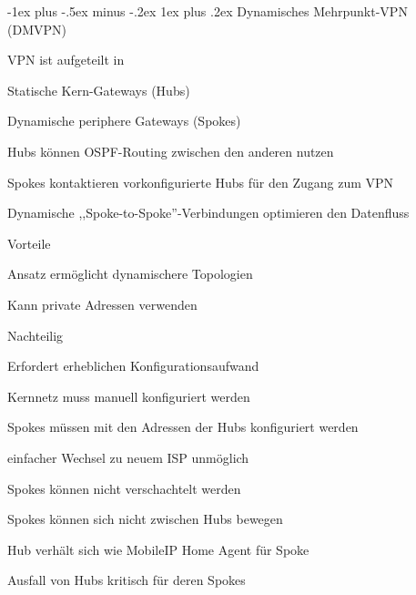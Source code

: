 \documentclass[a4paper]{article}
\makeatletter
\renewcommand{\subsubsection}{\@startsection{subsubsection}{3}{0mm}%
 {-1ex plus -.5ex minus -.2ex}%
 {1ex plus .2ex}%
 {\normalfont\small\bfseries}}
\makeatother
\begin{document}
\begin{multicols}{3}
      \subsubsection{Dynamisches Mehrpunkt-VPN (DMVPN)}
      \begin{itemize*}
            \item VPN ist aufgeteilt in
            \begin{itemize*}
                  \item Statische Kern-Gateways (Hubs)
                  \item Dynamische periphere Gateways (Spokes)
            \end{itemize*}
            \item Hubs können OSPF-Routing zwischen den anderen nutzen
            \item Spokes kontaktieren vorkonfigurierte Hubs für den Zugang zum VPN
            \item Dynamische ,,Spoke-to-Spoke''-Verbindungen optimieren den Datenfluss
            \item Vorteile
            \begin{itemize*}
                  \item Ansatz ermöglicht dynamischere Topologien
                  \item Kann private Adressen verwenden
            \end{itemize*}
            \item Nachteilig
            \begin{itemize*}
                  \item Erfordert erheblichen Konfigurationsaufwand
                  \begin{itemize*}
                        \item Kernnetz muss manuell konfiguriert werden
                        \item Spokes müssen mit den Adressen der Hubs konfiguriert werden
                        \item einfacher Wechsel zu neuem ISP unmöglich
                  \end{itemize*}
                  \item Spokes können nicht verschachtelt werden
                  \item Spokes können sich nicht zwischen Hubs bewegen
                  \item Hub verhält sich wie MobileIP Home Agent für Spoke
                  \item Ausfall von Hubs kritisch für deren Spokes
            \end{itemize*}
      \end{itemize*}


\end{multicols}
\end{document}
